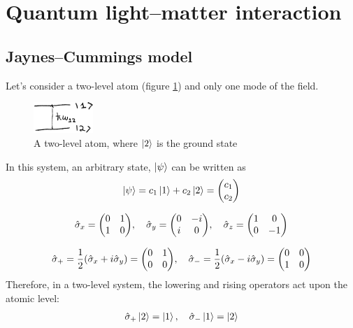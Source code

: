 \section{Quantum light--matter interaction}
\subsection{Jaynes--Cummings model}
Let's consider a two-level atom (figure \ref{fig:two-level-cummings}) and only one mode of the field.
\begin{figure}[H]
	\centering
	\includegraphics[width=0.2\textwidth]{./images/5-two-level-cummings}
	\caption{A two-level atom, where $\ket{2}$ is the ground state}
	\label{fig:two-level-cummings}
\end{figure}

In this system, an arbitrary state, $\ket{\psi}$ can be written as
\begin{align}
	\ket{\psi} = c_{1} \ket{1} + c_{2} \ket{2} = \mqty(c_{1} \\ c_{2})
\end{align}

\begin{defi}
	\begin{align}
		\hat{\sigma}_{x} = \mqty(\pmat{1}) \qc \hat{\sigma}_{y} = \mqty(\pmat{2}) \qc \hat{\sigma}_{z} = \mqty(\pmat{3})
	\end{align}
\end{defi}

\begin{defi}
	\begin{align}
		\hat{\sigma}_{+} = \frac{1}{2} (\hat{\sigma}_{x} + i \hat{\sigma}_{y}) = \mqty(0 & 1 \\ 0 & 0) \qc \hat{\sigma}_{-} = \frac{1}{2} (\hat{\sigma}_{x} - i \hat{\sigma}_{y}) = \mqty(0 & 0 \\ 1 & 0)
	\end{align}
	Therefore, in a two-level system, the lowering and rising operators act upon the atomic level:
	\begin{align*}
		\hat{\sigma}_{+} \ket{2} = \ket{1} \qc \hat{\sigma}_{-} \ket{1} = \ket{2}
	\end{align*}
\end{defi}

